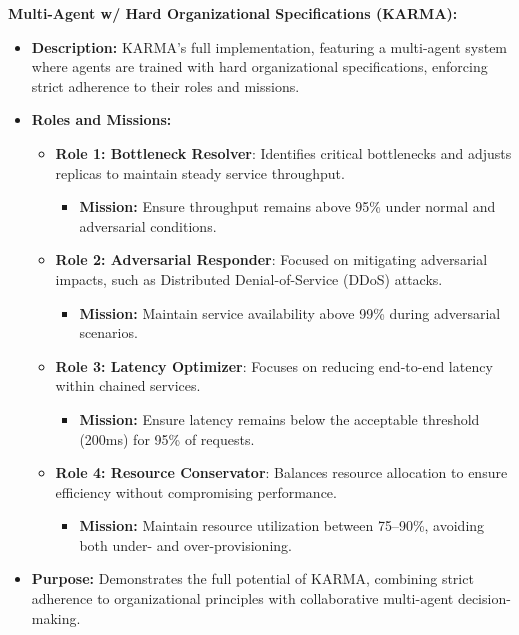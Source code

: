 \documentclass[conference]{IEEEtran}
\begin{document}
\noindent \textbf{Multi-Agent w/ Hard Organizational Specifications (KARMA):}
\begin{itemize}
    \item \textbf{Description:} KARMA's full implementation, featuring a multi-agent system where agents are trained with hard organizational specifications, enforcing strict adherence to their roles and missions.
    \item \textbf{Roles and Missions:}
    \begin{itemize}
        \item \textbf{Role 1: Bottleneck Resolver}: Identifies critical bottlenecks and adjusts replicas to maintain steady service throughput.
        \begin{itemize}
            \item \textbf{Mission:} Ensure throughput remains above 95\% under normal and adversarial conditions.
        \end{itemize}
        \item \textbf{Role 2: Adversarial Responder}: Focused on mitigating adversarial impacts, such as Distributed Denial-of-Service (DDoS) attacks.
        \begin{itemize}
            \item \textbf{Mission:} Maintain service availability above 99\% during adversarial scenarios.
        \end{itemize}
        \item \textbf{Role 3: Latency Optimizer}: Focuses on reducing end-to-end latency within chained services.
        \begin{itemize}
            \item \textbf{Mission:} Ensure latency remains below the acceptable threshold (200ms) for 95\% of requests.
        \end{itemize}
        \item \textbf{Role 4: Resource Conservator}: Balances resource allocation to ensure efficiency without compromising performance.
        \begin{itemize}
            \item \textbf{Mission:} Maintain resource utilization between 75–90\%, avoiding both under- and over-provisioning.
        \end{itemize}
    \end{itemize}
    \item \textbf{Purpose:} Demonstrates the full potential of KARMA, combining strict adherence to organizational principles with collaborative multi-agent decision-making.
\end{itemize}
\end{document}
